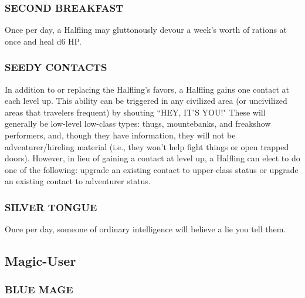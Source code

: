 \documentclass[twoside]{article}
\begin{document}
\subsubsection*{\footnotesize{S}\scriptsize{ECOND} \footnotesize{B}\scriptsize{REAKFAST}\normalsize}

Once per day, a Halfling may gluttonously devour a week's worth of rations at once and heal d6 HP.

\subsubsection*{\footnotesize{S}\scriptsize{EEDY} \footnotesize{C}\scriptsize{ONTACTS}\normalsize}

In addition to or replacing the Halfling's favors, a Halfling gains one contact at each level up. This ability can be triggered in any civilized area (or uncivilized areas that travelers frequent) by shouting ``HEY, IT'S YOU!" These will generally be low-level low-class types: thugs, mountebanks, and freakshow performers, and, though they have information, they will not be adventurer/hireling material (i.e., they won't help fight things or open trapped doors). However, in lieu of gaining a contact at level up, a Halfling can elect to do one of the following: upgrade an existing contact to upper-class status or upgrade an existing contact to adventurer status.

\subsubsection*{\footnotesize{S}\scriptsize{ILVER} \footnotesize{T}\scriptsize{ONGUE}\normalsize}

Once per day, someone of ordinary intelligence will believe a lie you tell them.

\subsection*{Magic-User}

\subsubsection*{\footnotesize{B}\scriptsize{LUE} \footnotesize{M}\scriptsize{AGE}\normalsize}
\end{document}

